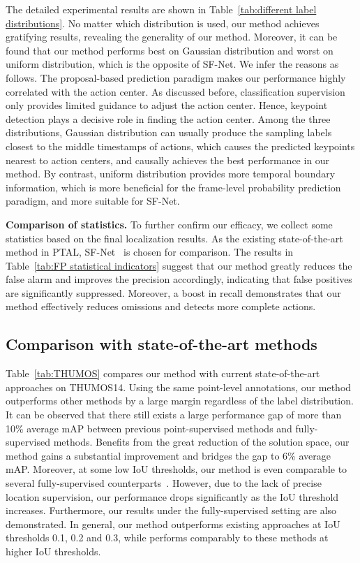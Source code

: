 \documentclass[final]{cvpr}
\begin{document}
The detailed experimental results are shown in Table~\ref{tab:different label distributions}.
No matter which distribution is used, our method achieves gratifying results, revealing the generality of our method. Moreover, it can be found that our method performs best on Gaussian distribution and worst on uniform distribution, which is the opposite of SF-Net. We infer the reasons as follows. The proposal-based prediction paradigm makes our performance highly correlated with the action center. As discussed before, classification supervision only provides limited guidance to adjust the action center. Hence, keypoint detection plays a decisive role in finding the action center. Among the three distributions, Gaussian distribution can usually produce the sampling labels closest to the middle timestamps of actions, which causes the predicted keypoints nearest to action centers, and causally achieves the best performance in our method. By contrast, uniform distribution provides more temporal boundary information, which is more beneficial for the frame-level probability prediction paradigm, and more suitable for SF-Net.




\textbf{Comparison of statistics.}
To further confirm our efficacy, we collect some statistics based on the final localization results. As the existing state-of-the-art method in PTAL, SF-Net~\cite{ma2020sf} is chosen for comparison.
The results in Table~\ref{tab:FP statistical indicators} suggest that our method greatly reduces the false alarm and improves the precision accordingly, indicating that false positives are significantly suppressed. Moreover, a boost in recall demonstrates that our method effectively reduces omissions and detects more complete actions.







\subsection{Comparison with state-of-the-art methods}
Table~\ref{tab:THUMOS} compares our method with current state-of-the-art approaches on THUMOS14.
Using the same point-level annotations, our method outperforms other methods by a large margin regardless of the label distribution. It can be observed that there still exists a large performance gap of more than 10\% average mAP between previous point-supervised methods and fully-supervised methods. Benefits from the great reduction of the solution space, our method gains a substantial improvement and bridges the gap to 6\% average mAP.
Moreover, at some low IoU thresholds, our method is even comparable to several fully-supervised counterparts~\cite{shou2016temporal,gao2017turn,zhao2017temporal}. However, due to the lack of precise location supervision, our performance drops significantly as the IoU threshold increases.
Furthermore, our results under the fully-supervised setting are also demonstrated. In general, our method outperforms existing approaches at IoU thresholds 0.1, 0.2 and 0.3, while performs comparably to these methods at higher IoU thresholds.
\end{document}

